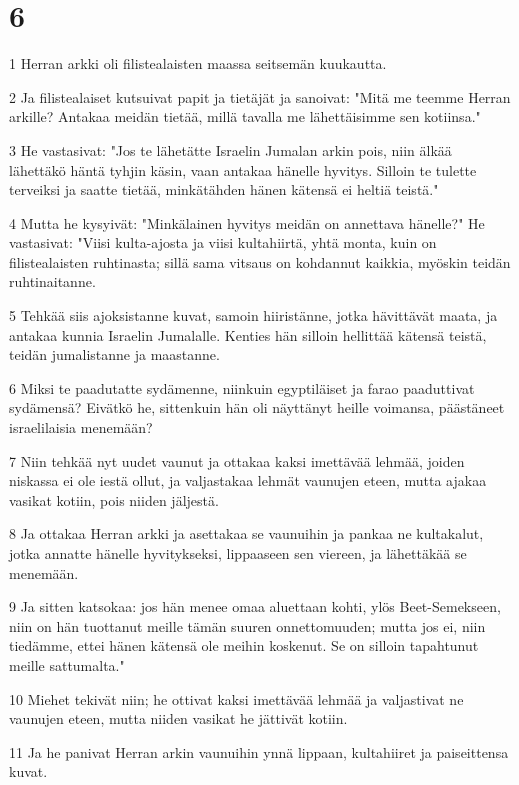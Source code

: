 \chapter{6}

\par 1 Herran arkki oli filistealaisten maassa seitsemän kuukautta.
\par 2 Ja filistealaiset kutsuivat papit ja tietäjät ja sanoivat: "Mitä me teemme Herran arkille? Antakaa meidän tietää, millä tavalla me lähettäisimme sen kotiinsa."
\par 3 He vastasivat: "Jos te lähetätte Israelin Jumalan arkin pois, niin älkää lähettäkö häntä tyhjin käsin, vaan antakaa hänelle hyvitys. Silloin te tulette terveiksi ja saatte tietää, minkätähden hänen kätensä ei heltiä teistä."
\par 4 Mutta he kysyivät: "Minkälainen hyvitys meidän on annettava hänelle?" He vastasivat: "Viisi kulta-ajosta ja viisi kultahiirtä, yhtä monta, kuin on filistealaisten ruhtinasta; sillä sama vitsaus on kohdannut kaikkia, myöskin teidän ruhtinaitanne.
\par 5 Tehkää siis ajoksistanne kuvat, samoin hiiristänne, jotka hävittävät maata, ja antakaa kunnia Israelin Jumalalle. Kenties hän silloin hellittää kätensä teistä, teidän jumalistanne ja maastanne.
\par 6 Miksi te paadutatte sydämenne, niinkuin egyptiläiset ja farao paaduttivat sydämensä? Eivätkö he, sittenkuin hän oli näyttänyt heille voimansa, päästäneet israelilaisia menemään?
\par 7 Niin tehkää nyt uudet vaunut ja ottakaa kaksi imettävää lehmää, joiden niskassa ei ole iestä ollut, ja valjastakaa lehmät vaunujen eteen, mutta ajakaa vasikat kotiin, pois niiden jäljestä.
\par 8 Ja ottakaa Herran arkki ja asettakaa se vaunuihin ja pankaa ne kultakalut, jotka annatte hänelle hyvitykseksi, lippaaseen sen viereen, ja lähettäkää se menemään.
\par 9 Ja sitten katsokaa: jos hän menee omaa aluettaan kohti, ylös Beet-Semekseen, niin on hän tuottanut meille tämän suuren onnettomuuden; mutta jos ei, niin tiedämme, ettei hänen kätensä ole meihin koskenut. Se on silloin tapahtunut meille sattumalta."
\par 10 Miehet tekivät niin; he ottivat kaksi imettävää lehmää ja valjastivat ne vaunujen eteen, mutta niiden vasikat he jättivät kotiin.
\par 11 Ja he panivat Herran arkin vaunuihin ynnä lippaan, kultahiiret ja paiseittensa kuvat.
